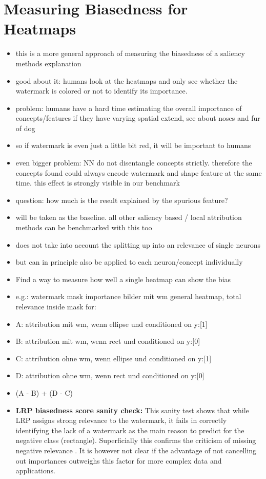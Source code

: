 \section{Measuring Biasedness for Heatmaps}
\begin{itemize}
    \item this is a more general approach of measuring the biasedness of a saliency methods explanation
    \item good about it: humans look at the heatmaps and only see whether the watermark is colored or not to identify its importance.
    \item problem: humans have a hard time estimating the overall importance of concepts/features if they have varying spatial extend, see \cite{Achtibat2022} about noses and fur of dog
    \item so if watermark is even just a little bit red, it will be important to humans
    \item even bigger problem: NN do not disentangle concepts strictly. therefore the concepts found could always encode watermark and shape feature at the same time. this effect is strongly visible in our benchmark
    \item question: how much is the result explained by the spurious feature?
    \item will be taken as the baseline. all other saliency based / local attribution methods can be benchmarked with this too
    \item does not take into account the splitting up into an relevance of single neurons
    \item but can in principle also be applied to each neuron/concept individually
    \item Find a way to measure how well a single heatmap can show the bias
    \item e.g.: watermark mask importance bilder mit wm general heatmap, total relevance inside mask for:
    \item A: attribution mit wm, wenn ellipse und conditioned on y:[1]
    \item B: attribution mit wm, wenn rect    und conditioned on y:[0]
    \item C: attribution ohne wm, wenn ellipse und conditioned on y:[1]
    \item D: attribution ohne wm, wenn rect    und conditioned on y:[0]
    \item (A - B) + (D - C)
    \item \textbf{LRP biasedness score sanity check:}
          This sanity test shows that while LRP assigns strong relevance to the watermark, it fails in correctly identifying the lack of a watermark as the main reason to predict for the negative class (rectangle). Superficially this confirms the criticism of missing negative relevance \cite{Sixt2020}. It is however not clear if the advantage of not cancelling out importances outweighs this factor for more complex data and applications.  


\end{itemize}

